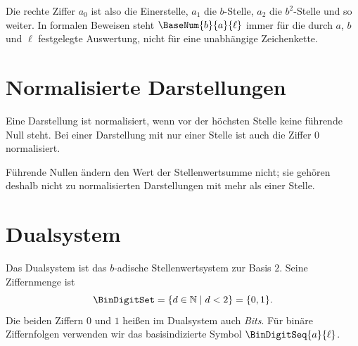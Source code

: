 \documentclass[main.tex]{subfiles}
\begin{document}

Die rechte Ziffer \(a_0\) ist also die Einerstelle, \(a_1\) die \(b\)-Stelle,
\(a_2\) die \(b^2\)-Stelle und so weiter. In formalen Beweisen steht
\(\BaseNum{b}{a}{\ell}\) immer für die durch \(a\), \(b\) und \(\ell\)
festgelegte Auswertung, nicht für eine unabhängige Zeichenkette.

\section{Normalisierte Darstellungen}

Eine Darstellung ist normalisiert, wenn vor der höchsten Stelle keine
führende Null steht. Bei einer Darstellung mit nur einer Stelle ist auch die
Ziffer \(0\) normalisiert.


Führende Nullen ändern den Wert der Stellenwertsumme nicht; sie gehören
deshalb nicht zu normalisierten Darstellungen mit mehr als einer Stelle.

\section{Dualsystem}

Das Dualsystem ist das \(b\)-adische Stellenwertsystem zur Basis \(2\). Seine
Ziffernmenge ist
\[
  \BinDigitSet
  =
  \{d\in\mathbb{N}\mid d<2\}
  =
  \{0,1\}.
\]
Die beiden Ziffern \(0\) und \(1\) heißen im Dualsystem auch \emph{Bits}. Für
binäre Ziffernfolgen verwenden wir das basisindizierte Symbol
\(\BinDigitSeq{a}{\ell}\).
\end{document}
